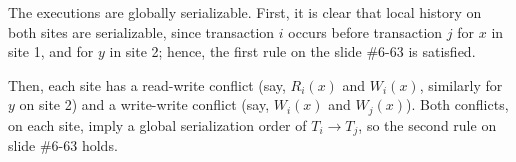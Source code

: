 The executions are globally serializable.
First, it is clear that local history on both sites are serializable, since transaction $i$ occurs before transaction $j$ for $x$ in site 1, and for $y$ in site 2;
hence, the first rule on the slide \#6-63 is satisfied.

Then, each site has a read-write conflict (say, $R_i(x)$ and $W_i(x)$, similarly for $y$ on site 2) and a write-write conflict (say, $W_i(x)$ and $W_j(x)$).
Both conflicts, on each site, imply a global serialization order of $T_i \rightarrow T_j$, so the second rule on slide \#6-63 holds.
